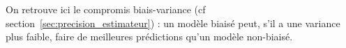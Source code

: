 On retrouve ici le compromis biais-variance (cf
section~\ref{sec:precision_estimateur}) : un modèle biaisé peut, s'il a une variance plus faible, faire de meilleures prédictions qu'un modèle non-biaisé.








